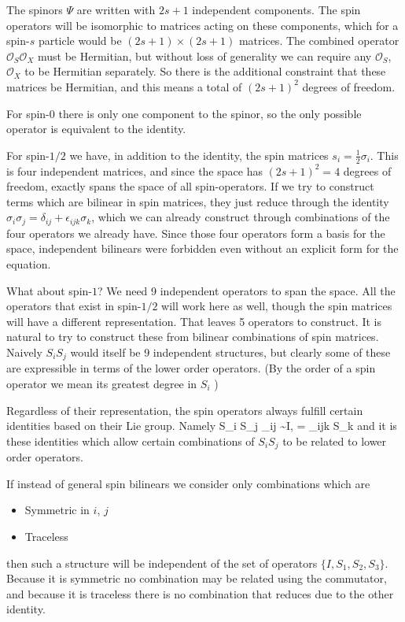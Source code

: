 The spinors $\Psi$ are written with $2s+1$ independent components.  The spin operators will be isomorphic to matrices acting on these components, which for a spin-$s$ particle would be $(2s+1) \times (2s+1)$ matrices.  The combined operator $\mathcal{O}_S \mathcal{O}_X$ must be Hermitian, but without loss of generality we can require any $\mathcal{O}_S$, $\mathcal{O}_X$ to be Hermitian separately.  So there is the additional constraint that these matrices be Hermitian, and this means a total of $(2s+1)^2$ degrees of freedom.


For spin-$0$ there is only one component to the spinor, so the only possible operator is equivalent to the identity.

For spin-$1/2$ we have, in addition to the identity, the spin matrices $s_i = \frac{1}{2} \sigma_i$.  This is four independent matrices, and since the space has $(2s+1)^2 = 4$ degrees of freedom, exactly spans the space of all spin-operators.  If we try to construct terms which are bilinear in spin matrices, they just reduce through the identity $\sigma_i \sigma_j = \delta_{ij} + \epsilon_{ijk}\sigma_k$, which we can already construct through combinations of the four operators we already have.  Since those four operators form a basis for the space, independent bilinears were forbidden even without an explicit form for the equation.


What about spin-$1$?  We need 9 independent operators to span the space.  All the operators that exist in spin-$1/2$ will work here as well, though the spin matrices will have a different representation.  That leaves 5 operators to construct.  It is natural to try to construct these from bilinear combinations of spin matrices.  Naively $S_i S_j$ would itself be 9 independent structures, but clearly some of these are expressible in terms of the lower order operators.  (By the order of a spin operator we mean its greatest degree in $S_i$ )  %

Regardless of their representation, the spin operators always fulfill certain identities based on their Lie group.  Namely
\beq
	S_i S_j \delta_{ij} \sim I, \; [S_i, S_j] = \epsilon_{ijk} S_k
\eeq
and it is these identities which allow certain combinations of $S_i S_j$ to be related to lower order operators.

If instead of general spin bilinears we consider only combinations which are
\begin{itemize}
  \item Symmetric in $i$, $j$ 
  \item Traceless
\end{itemize}
then such a structure will be independent of the set of operators $\{I, S_1, S_2, S_3\}$.  Because it is symmetric no combination may be related using the commutator, and because it is traceless there is no combination that reduces due to the other identity.  %

